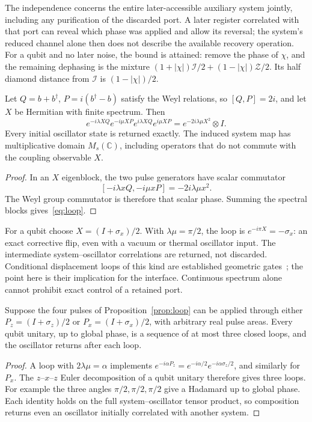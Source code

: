 The independence concerns the entire later-accessible auxiliary system jointly,
including any purification of the discarded port. A later register correlated with that port can reveal which phase
was applied and allow its reversal; the system's reduced channel alone then does not
describe the available recovery operation. For a qubit and no later noise, the bound
is attained: remove the phase of $\chi$, and the remaining dephasing is the mixture
$(1+|\chi|)\mathcal I/2+(1-|\chi|)\mathcal Z/2$. Its half diamond distance from
$\mathcal I$ is $(1-|\chi|)/2$.

\begin{proposition}\label{prop:loop}
Let $Q=b+b^\dagger$, $P=i(b^\dagger-b)$ satisfy the Weyl relations, so $[Q,P]=2i$,
and let $X$ be Hermitian with finite spectrum. Then
\begin{equation}
e^{-i\lambda XQ}e^{-i\mu XP}e^{i\lambda XQ}e^{i\mu XP}
=e^{-2i\lambda\mu X^2}\otimes I .
\label{eq:loop}
\end{equation}
Every initial oscillator state is returned exactly. The induced system map has
multiplicative domain $M_s(\mathbb C)$, including operators that do not commute
with the coupling observable $X$.
\end{proposition}
\begin{proof}
In an $X$ eigenblock, the two pulse generators have scalar commutator
\[
[-i\lambda xQ,-i\mu xP]=-2i\lambda\mu x^2.
\]
The Weyl group commutator is therefore
that scalar phase. Summing the spectral blocks gives~\eqref{eq:loop}.
\end{proof}

For a qubit choose $X=(I+\sigma_x)/2$. With $\lambda\mu=\pi/2$, the loop is
$e^{-i\pi X}=-\sigma_x$: an exact corrective flip, even with a vacuum or thermal
oscillator input. The intermediate system--oscillator correlations are returned, not
discarded. Conditional displacement loops of this kind are established geometric
gates~\cite{Milburn1999}; the point here is their implication for the interface.
Continuous spectrum alone cannot prohibit exact control of a retained port.

\begin{corollary}
\label{cor:universal}
Suppose the four pulses of Proposition~\ref{prop:loop} can be applied through
either $P_z=(I+\sigma_z)/2$ or $P_x=(I+\sigma_x)/2$, with arbitrary real pulse
areas. Every qubit unitary, up to global phase, is a sequence of at most three
closed loops, and the oscillator returns after each loop.
\end{corollary}
\begin{proof}
A loop with $2\lambda\mu=\alpha$ implements
$e^{-i\alpha P_z}=e^{-i\alpha/2}e^{-i\alpha\sigma_z/2}$, and similarly for $P_x$.
The $z$--$x$--$z$ Euler decomposition of a qubit unitary therefore gives three
loops. For example the three angles $\pi/2,\pi/2,\pi/2$ give a Hadamard up to
global phase. Each identity holds on the full system--oscillator tensor product,
so composition returns even an oscillator initially correlated with another system.
\end{proof}

